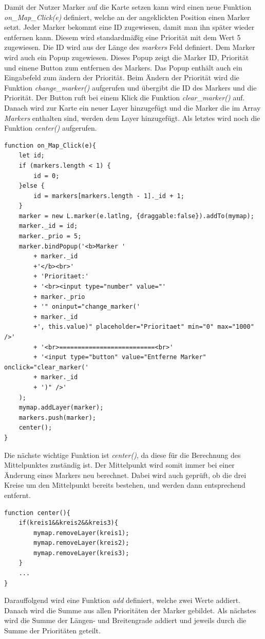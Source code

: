 \documentclass[a4paper, 12pt]{scrreprt}
\begin{document}
Damit der Nutzer Marker auf die Karte setzen kann wird einen neue Funktion \textit{on\_Map\_Click(e)} definiert, welche an der angeklickten Position einen Marker setzt.
Jeder Marker bekommt eine ID zugewiesen, damit man ihn später wieder entfernen kann.
Diesem wird standardmäßig eine Priorität mit dem Wert 5 zugewiesen.
Die ID wird aus der Länge des \textit{markers} Feld definiert.
Dem Marker wird auch ein Popup zugewiesen.
Dieses Popup zeigt die Marker ID, Priorität und einene Button zum entfernen des Markers.
Das Popup enthält auch ein Eingabefeld zum ändern der Priorität.
Beim Ändern der Priorität wird die Funktion \textit{change}\_\textit{marker()} aufgerufen und übergibt die ID des Markers und die Priorität.
Der Button ruft bei einem Klick die Funktion \textit{clear}\_\textit{marker()} auf.
Danach wird zur Karte ein neuer Layer hinzugefügt und die Marker die im Array \textit{Markers} enthalten sind, werden dem Layer hinzugefügt.
Als letztes wird noch die Funktion \textit{center()} aufgerufen.
\begin{lstlisting}
function on_Map_Click(e){
	let id;
	if (markers.length < 1) {
		id = 0;
	}else {
		id = markers[markers.length - 1]._id + 1;
	}
	marker = new L.marker(e.latlng, {draggable:false}).addTo(mymap);
	marker._id = id;
	marker._prio = 5;
	marker.bindPopup('<b>Marker '
		+ marker._id
		+'</b><br>'
    	+ 'Prioritaet:'
		+ '<br><input type="number" value="'
		+ marker._prio
		+ '" oninput="change_marker('
		+ marker._id
		+', this.value)" placeholder="Prioritaet" min="0" max="1000" />'
		+ '<br>==========================<br>'
		+ '<input type="button" value="Entferne Marker" onclick="clear_marker('
		+ marker._id
		+ ')" />'
	);
	mymap.addLayer(marker);
	markers.push(marker);
	center();
}
\end{lstlisting}
Die nächste wichtige Funktion ist \textit{center()}, da diese für die Berechnung des Mittelpunktes zuständig ist.
Der Mittelpunkt wird somit immer bei einer Änderung eines Markers neu berechnet.
Dabei wird auch geprüft, ob die drei Kreise um den Mittelpunkt bereits bestehen, und werden dann entsprechend entfernt.
\begin{lstlisting}
function center(){
	if(kreis1&&kreis2&&kreis3){
		mymap.removeLayer(kreis1);
		mymap.removeLayer(kreis2);
		mymap.removeLayer(kreis3);
	}
	...
}
\end{lstlisting}
Darauffolgend wird eine Funktion \textit{add} definiert, welche zwei Werte addiert. Danach wird die Summe aus allen Prioritäten der Marker gebildet. Als nächstes wird die Summe der Längen- und Breitengrade addiert und jeweils durch die Summe der Prioritäten geteilt.
\end{document}
